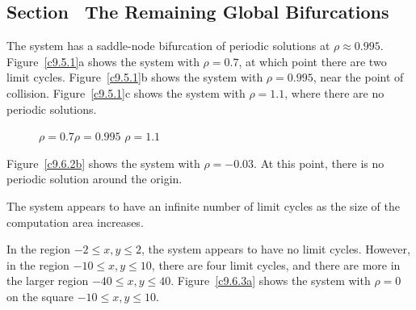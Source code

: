 \documentclass{ximera}
\begin{document}
\begin{figure}[htb]
                       \centerline{%
                       }
\end{figure}



\subsection*{Section~\protect{\ref{S:GlobalBif}} The Remaining Global Bifurcations}

The system has a saddle-node bifurcation of periodic solutions
at $\rho \approx 0.995$.  Figure~\ref{c9.5.1}a shows the system
with $\rho = 0.7$, at which point there are two limit cycles. 
Figure~\ref{c9.5.1}b shows the system with $\rho = 0.995$, near the point
of collision.  Figure~\ref{c9.5.1}c shows the system with $\rho = 1.1$, where
there are no periodic solutions.

\begin{figure}[htb]
                       \centerline{%
                       }
		\centerline{$\rho = 0.7$\hspace{1.3in}$\rho = 0.995$
\hspace{1.3in}$\rho = 1.1$}
\end{figure}

\newpage
{} Figure~\ref{c9.6.2b} shows the system with $\rho = -0.03$. 
At this point, there is no periodic solution around the origin.

\begin{figure}[htb]
                       \centerline{%
                       }
\end{figure}

\ans The system appears to have an infinite number of limit cycles
as the size of the computation area increases.

\soln In the region $-2 \leq x,y \leq 2$, the system appears to have no
limit cycles.  However, in the region $-10 \leq x,y \leq 10$, there are
four limit cycles, and there are more in the larger region $-40 \leq x,y
\leq 40$.  Figure~\ref{c9.6.3a} shows the system with $\rho = 0$ on the
square $-10 \leq x,y \leq 10$.
\end{document}
